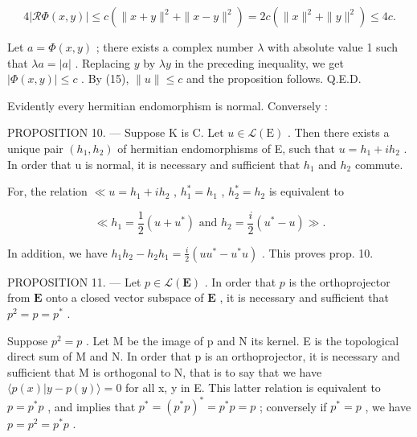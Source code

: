\[
4 \left| \mathcal {R} \Phi (x, y) \right| \leqslant c \left(\| x + y \| ^ {2} + \| x - y \| ^ {2}\right) = 2 c \left(\| x \| ^ {2} + \| y \| ^ {2}\right) \leqslant 4 c.
\]

Let \(a = \Phi(x, y)\) ; there exists a complex number \(\lambda\) with absolute value 1 such that \(\lambda a = |a|\) . Replacing \(y\) by \(\lambda y\) in the preceding inequality, we get \(|\Phi(x,y)| \leqslant c\) . By (15), \(\|u\| \leqslant c\) and the proposition follows. Q.E.D.

Evidently every hermitian endomorphism is normal. Conversely :

PROPOSITION 10. --- Suppose K is C. Let \(u \in \mathcal{L}(\mathrm{E})\) . Then there exists a unique pair \((h_1, h_2)\) of hermitian endomorphisms of E, such that \(u = h_1 + ih_2\) . In order that u is normal, it is necessary and sufficient that \(h_1\) and \(h_2\) commute.

For, the relation \(\ll u = h_1 + ih_2\) , \(h_1^* = h_1\) , \(h_2^* = h_2\) is equivalent to

\[
\ll h _ {1} = \frac {1}{2} (u + u ^ {*}) \text { and } h _ {2} = \frac {i}{2} (u ^ {*} - u) \gg .
\]

In addition, we have \(h_1h_2 - h_2h_1 = \frac{i}{2} (uu^* - u^*u)\) . This proves prop. 10.

PROPOSITION 11. --- Let \(p \in \mathcal{L}(\mathbf{E})\) . In order that \(p\) is the orthoprojector from \(\mathbf{E}\) onto a closed vector subspace of \(\mathbf{E}\) , it is necessary and sufficient that \(p^2 = p = p^*\) .

Suppose \(p^{2} = p\) . Let M be the image of p and N its kernel. E is the topological direct sum of M and N. In order that p is an orthoprojector, it is necessary and sufficient that M is orthogonal to N, that is to say that we have \(\langle p(x)|y - p(y)\rangle = 0\) for all x, y in E. This latter relation is equivalent to \(p = p^{*}p\) , and implies that \(p^{*} = (p^{*}p)^{*} = p^{*}p = p\) ; conversely if \(p^{*} = p\) , we have \(p = p^{2} = p^{*}p\) .


